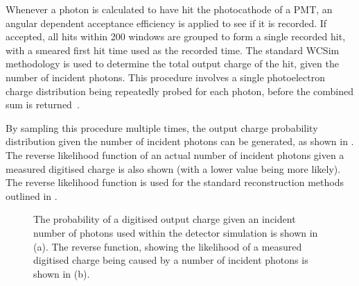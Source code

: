 Whenever a photon is calculated to have hit the photocathode of a PMT, an angular dependent
acceptance efficiency is applied to see if it is recorded. If accepted, all hits within
\SI{200}{} windows are grouped to form a single recorded hit, with a smeared first hit
time used as the recorded time. The standard WCSim methodology is used to determine the total
output charge of the hit, given the number of incident photons. This procedure involves a single
photoelectron charge distribution being repeatedly probed for each photon, before the combined sum
is returned~\cite{tutorial2020}.

By sampling this procedure multiple times, the output charge probability distribution given the
number of incident photons can be generated, as shown in . The reverse
likelihood function of an actual number of incident photons given a measured digitised charge is
also shown (with a lower value being more likely). The reverse likelihood function is used for the
standard reconstruction methods outlined in .

\begin{figure} %
    \centering
    \quad
    \caption[Detector simulation PMT digitisation function]
    {The probability of a digitised output charge given an incident number of photons used within
    the detector simulation is shown in (a). The reverse function, showing the likelihood of a
    measured digitised charge being caused by a number of incident photons is shown in (b).}
    \label{fig:digitisation}
\end{figure}

